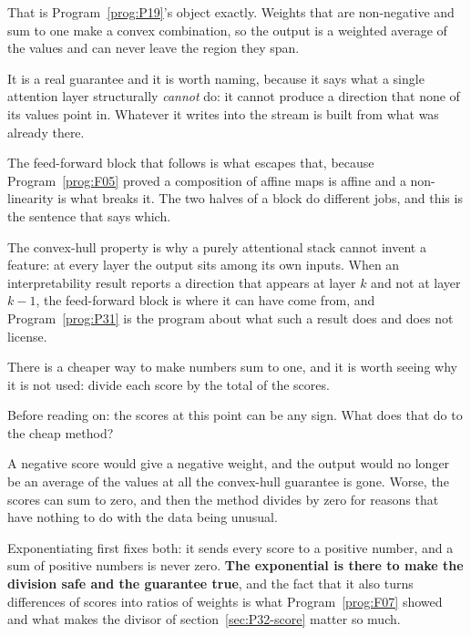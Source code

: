 \begin{fr}

That is Program~\ref{prog:P19}'s object exactly. Weights that are
non-negative and sum to one make a convex combination, so the output is a
weighted average of the values and can never leave the region they span.

It is a real guarantee and it is worth naming, because it says what a single
attention layer structurally \emph{cannot} do: it cannot produce a direction
that none of its values point in. Whatever it writes into the stream is
built from what was already there.

The feed-forward block that follows is what escapes that, because
Program~\ref{prog:F05} proved a composition of affine maps is affine and a
non-linearity is what breaks it. The two halves of a block do different
jobs, and this is the sentence that says which.

\begin{aibox}
The convex-hull property is why a purely attentional stack cannot invent a
feature: at every layer the output sits among its own inputs. When an
interpretability result reports a direction that appears at layer $k$ and
not at layer $k-1$, the feed-forward block is where it can have come from,
and Program~\ref{prog:P31} is the program about what such a result does and
does not license.
\end{aibox}
\end{fr}

\begin{fr}
There is a cheaper way to make numbers sum to one, and it is worth seeing
why it is not used: divide each score by the total of the scores.

Before reading on: the scores at this point can be any sign. What does that
do to the cheap method?
\dotline
\nextframe
\end{fr}

\begin{fr}

A negative score would give a negative weight, and the output would no longer
be an average of the values at all \dash{} the convex-hull guarantee is gone.
Worse, the scores can sum to zero, and then the method divides by zero for
reasons that have nothing to do with the data being unusual.

Exponentiating first fixes both: it sends every score to a positive number,
and a sum of positive numbers is never zero. \textbf{The exponential is
there to make the division safe and the guarantee true}, and the fact that it
also turns differences of scores into ratios of weights is what
Program~\ref{prog:F07} showed and what makes the divisor of
section~\ref{sec:P32-score} matter so much.
\end{fr}

